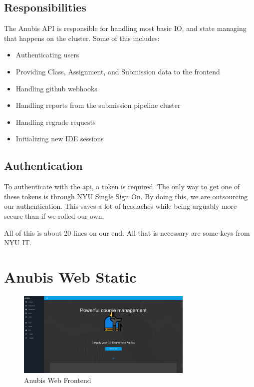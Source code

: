 \subsection{Responsibilities}\label{subsec:api-responsibilities}

The Anubis API is responsible for handling most basic
IO, and state managing that happens on the cluster.
Some of this includes:

\begin{itemize}
    \item Authenticating users
    \item Providing Class, Assignment, and Submission data to the frontend
    \item Handling github webhooks
    \item Handling reports from the submission pipeline cluster
    \item Handling regrade requests
    \item Initializing new IDE sessions
\end{itemize}

\subsection{Authentication}\label{subsec:api-authentication}

To authenticate with the api, a token is required.
The only way to get one of these tokens is through NYU Single Sign On.
By doing this, we are outsourcing our authentication.
This saves a lot of headaches while being arguably more secure than if we rolled our own.

All of this is about 20 lines on our end.
All that is necessary are some keys from NYU IT.


\section{Anubis Web Static}\label{sec:web}

\begin{figure}[ht]
    \centering
    \includegraphics[width=0.75\textwidth]{figures/anubis-frontend.png}
    \caption{Anubis Web Frontend\label{fig:web-frontend}}
\end{figure}

